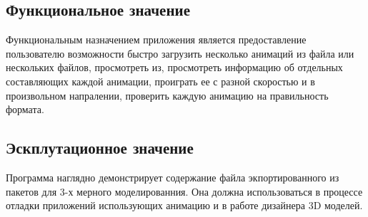 \subsection{Функциональное значение}
Функциональным назначением приложения является предоставление пользователю возможности быстро загрузить несколько анимаций из файла или нескольких файлов, просмотреть из, просмотреть информацию об отдельных составляющих каждой анимации, проиграть ее с разной скоростью и в произвольном напралении, проверить каждую анимацию на правильность формата.

\subsection{Эскплутационное значение}
Программа наглядно демонстрирует содержание файла экпортированного из пакетов для 3-х мерного моделированния. Она должна использоваться в процессе отладки приложений использующих анимацию и в работе дизайнера  3D моделей.
